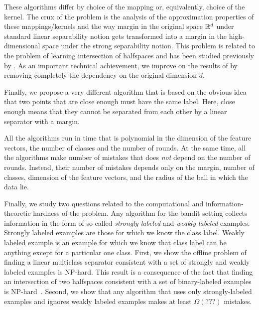 These algorithms differ by choice of the mapping or, equivalently, choice of the
kernel. The crux of the problem is the analysis of the approximation properties
of these mappings/kernels and the way margin in the original space $\mathbb{R}^d$ under
standard linear separability notion gets transformed into a margin in the
high-dimensional space under the strong separability notion. This problem is
related to the problem of learning intersection of halfspaces and has been
studied previously by \cite{Klivans-Servedio-2008}. As an important technical
achievement, we improve on the results of \cite{Klivans-Servedio-2008} by
removing completely the dependency on the original dimension $d$.

Finally, we propose a very different algorithm that is based on the obvious idea
that two points that are close enough must have the same label. Here, close
enough means that they cannot be separated from each other by a linear separator
with a margin.

All the algorithms run in time that is polynomial in the dimension of the
feature vectors, the number of classes and the number of rounds. At the same
time, all the algorithms make number of mistakes that does \emph{not} depend
on the number of rounds. Instead, their number of mistakes depends only on the
margin, number of classes, dimension of the feature vectors, and the radius of
the ball in which the data lie.

Finally, we study two questions related to the computational and
information-theoretic hardness of the problem. Any algorithm for the bandit
setting collects information in the form of so called \emph{strongly labeled}
and \emph{weakly labeled} examples. Strongly labeled examples are those for
which we know the class label. Weakly labeled example is an example for which we
know that class label can be anything except for a particular one class. First,
we show the offline problem of finding a linear multiclass separator consistent
with a set of strongly and weakly labeled examples is NP-hard. This result is a
consequence of the fact that finding an intersection of two halfspaces
consistent with a set of binary-labeled examples is
NP-hard~\citep{Blum-Rivest-1993}. Second, we show that any algorithm that uses
only strongly-labeled examples and ignores weakly labeled examples makes at
least $\Omega(???)$ mistakes.
